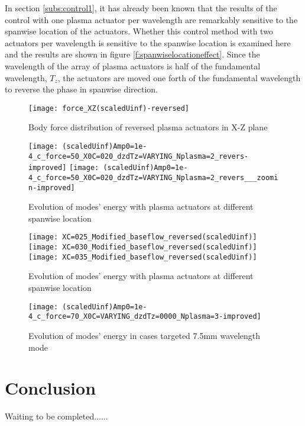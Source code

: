 \documentclass{AIAA}
\begin{document}
In section \ref{subs:control1}, it has already been known that the results of the control with one plasma actuator per wavelength are remarkably sensitive to the spanwise location of the actuators. Whether this control method with two actuators per wavelength is sensitive to the spanwise location is examined here and the results are shown in figure \ref{f:spanwiselocationeffect}. Since the wavelength of the array of plasma actuators is half of the fundamental wavelength, $T_z$, the actuators are moved one forth of the fundamental wavelength to reverse the phase in spanwise direction. 
\begin{figure}
\centering
\texttt{[image: force\_XZ(scaledUinf)-reversed]}
\caption{Body force distribution of reversed plasma actuators in X-Z plane}%
\end{figure}

\begin{figure}
\centering
\texttt{[image: (scaledUinf)Amp0=1e-4\_c\_force=50\_X0C=020\_dzdTz=VARYING\_Nplasma=2\_revers-improved]}
\texttt{[image: (scaledUinf)Amp0=1e-4\_c\_force=50\_X0C=020\_dzdTz=VARYING\_Nplasma=2\_revers\_\_\_zoomin-improved]}
\caption{Evolution of modes' energy with plasma actuators at different spanwise location}%
\end{figure}

\begin{figure}
\centering
\texttt{[image: XC=025\_Modified\_baseflow\_reversed(scaledUinf)]}
\texttt{[image: XC=030\_Modified\_baseflow\_reversed(scaledUinf)]}
\texttt{[image: XC=035\_Modified\_baseflow\_reversed(scaledUinf)]}
\caption{Evolution of modes' energy with plasma actuators at different spanwise location}%
\end{figure}

\begin{figure}
\centering
\texttt{[image: (scaledUinf)Amp0=1e-4\_c\_force=70\_X0C=VARYING\_dzdTz=0000\_Nplasma=3-improved]}
\caption{Evolution of modes' energy in cases targeted 7.5mm wavelength mode}%
\end{figure}






\section{Conclusion}
Waiting to be completed......
\end{document}
